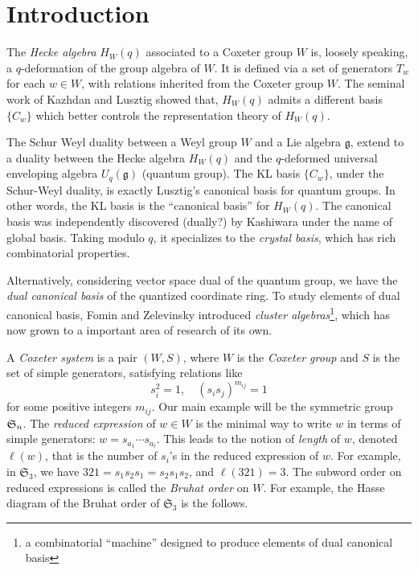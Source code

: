 \section{Introduction}

The \emph{Hecke algebra} $H_W(q)$ associated to a Coxeter group $W$ is, loosely speaking, a $q$-deformation of the group algebra of $W$. It is defined via a set of generators $T_w$ for each $w\in W$, with relations inherited from the Coxeter group $W$. The seminal work of Kazhdan and Lusztig \cite{KL79} showed that, $H_W(q)$ admits a different basis $\{C_w\}$ which better controls the representation theory of $H_W(q)$. 

The Schur Weyl duality between a Weyl group $W$ and a Lie algebra $\mathfrak{g}$, extend to a duality between the Hecke algebra $H_W(q)$ and the $q$-deformed universal enveloping algebra $U_q(\mathfrak{g})$ (quantum group). The KL basis $\{C_w\}$, under the Schur-Weyl duality, is exactly Lusztig's canonical basis for quantum groups. In other words, the KL basis is the ``canonical basis'' for $H_W(q)$. The canonical basis was independently discovered (dually?) by Kashiwara under the name of global basis. Taking modulo $q$, it specializes to the \emph{crystal basis}, which has rich combinatorial properties.

Alternatively, considering vector space dual of the quantum group, we have the \emph{dual canonical basis} of the quantized coordinate ring. To study elements of dual canonical basis, Fomin and Zelevinsky introduced \emph{cluster algebras}\footnote{a combinatorial ``machine'' designed to produce elements of dual canonical basis}, which has now grown to a important area of research of its own.

A \emph{Coxeter system} is a pair $(W,S)$, where $W$ is the \emph{Coxeter group} and $S$ is the set of simple generators, satisfying relations like
\[
s_i^2=1,\quad
(s_is_j)^{m_{ij}}=1	
\]for some positive integers $m_{ij}$. Our main example will be the symmetric group $\mathfrak{S}_n$. The \emph{reduced expression} of $w\in W$ is the minimal way to write $w$ in terms of simple generators: $w=s_{a_1}\cdots s_{a_l}$. This leads to the notion of \emph{length} of $w$, denoted $\ell(w)$, that is the number of $s_i$'s in the reduced expression of $w$. For example, in $\mathfrak{S}_3$, we have $321=s_1s_2s_1=s_2s_1s_2$, and $\ell(321)=3$.
The subword order on reduced expressions is called the \emph{Bruhat order} on $W$. For example, the Hasse diagram of the Bruhat order of $\mathfrak{S}_3$ is the follows.
\begin{center}
\end{center}


